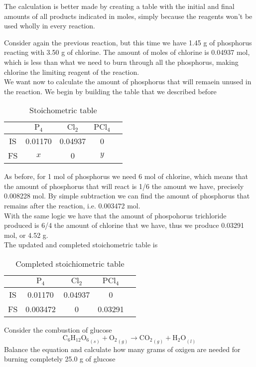 \documentclass[../qm.tex]{subfiles}
\begin{document}
The calculation is better made by creating a table with the initial and final amounts of all products indicated in moles, simply because the reagents won't be used wholly in every reaction.
\begin{eg}
	Consider again the previous reaction, but this time we have 1.45 g of phosphorus reacting with 3.50 g of chlorine. The amount of moles of chlorine is 0.04937 mol, which is less than what we need to burn through all the phosphorus, making chlorine the limiting reagent of the reaction.\\
	We want now to calculate the amount of phosphorus that will remaein unused in the reaction. We begin by building the table that we described before
	\begin{table}[H]
		\centering
		\begin{tabular}{c|c|c|c|c}
			&$\mathrm{P_4}$&$\mathrm{Cl_2}$&$\mathrm{PCl_4}$\\\hline
			IS&0.01170&0.04937&0\\\hline
			FS&$x$&0&$y$\\\hline
		\end{tabular}
		\caption{Stoichometric table}
		\label{tab:pcl4tab.chem}
	\end{table}
	As before, for 1 mol of phosphorus we need 6 mol of chlorine, which means that the amount of phosphorus that will react is 1/6 the amount we have, precisely 0.008228 mol. By simple subtraction we can find the amount of phosphorus that remains after the reaction, i.e. 0.003472 mol.\\
	With the same logic we have that the amount of phospohorus trichloride produced is 6/4 the amount of chlorine that we have, thus we produce 0.03291 mol, or 4.52 g.\\
	The updated and completed stoichometric table is
	\begin{table}[H]
		\centering
		\begin{tabular}{c|c|c|c|c}
			&$\mathrm{P_4}$&$\mathrm{Cl_2}$&$\mathrm{PCl_4}$\\\hline
			IS&0.01170&0.04937&0\\\hline
			FS&0.003472&0&0.03291\\\hline
		\end{tabular}
		\caption{Completed stoichiometric table}
		\label{tab:pcl4comp.chem}
	\end{table}
\end{eg}
\begin{exe}
	Consider the combustion of glucose
	\begin{equation}
		\mathrm{C_6H_{12}O_6}_{(s)}+\mathrm{O_2}_{(g)}\to\mathrm{CO_2}_{(g)}+\mathrm{H_2O}_{(l)}
		\label{eq:glucosecomb.chexe}
	\end{equation}
	Balance the equation and calculate how many grams of oxigen are needed for burning completely 25.0 g of glucose
\end{exe}
\end{document}
